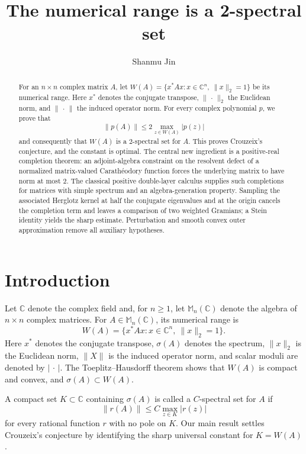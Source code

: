 \documentclass{aomart}
\title{The numerical range is a 2-spectral set}
\author{Shanmu Jin}
\theoremstyle{definition}
\newcommand{\C}{\mathbb C}
\newcommand{\Mn}{\mathbb M_n(\C)}
\begin{document}
\begin{abstract}
For an $n\times n$ complex matrix $A$, let
$W(A)=\{x^*Ax:x\in\C^n,\ \lVert x\rVert_2=1\}$ be its numerical range.
Here $x^*$ denotes the conjugate transpose, $\lVert\,\cdot\,\rVert_2$
the Euclidean norm, and $\lVert\,\cdot\,\rVert$ the induced operator
norm.  For every complex polynomial $p$, we prove that
\[
  \lVert p(A)\rVert\leq
  2\max_{z\in W(A)}\lvert p(z)\rvert
\]
and consequently that $W(A)$ is a $2$-spectral set for $A$.  This
proves Crouzeix's conjecture, and the constant is optimal.  The central
new ingredient is a positive-real
completion theorem: an adjoint-algebra constraint on the resolvent
defect of a normalized matrix-valued Carath\'eodory function forces the
underlying matrix to have norm at most $2$.  The classical positive
double-layer calculus supplies such completions for matrices with
simple spectrum and an algebra-generation property.  Sampling the
associated Herglotz kernel at half the conjugate eigenvalues and at the
origin cancels the completion term and leaves a comparison of two
weighted Gramians; a Stein identity yields the sharp estimate.
Perturbation and smooth convex outer approximation remove all auxiliary
hypotheses.
\end{abstract}

\maketitle

\section{Introduction}
\label{sec:introduction}

Let $\C$ denote the complex field and, for $n\geq1$, let $\Mn$ denote
the algebra of $n\times n$ complex matrices.  For $A\in\Mn$, its
numerical range is
\begin{equation}
  W(A)=\{x^*Ax:x\in\C^n,\ \lVert x\rVert_2=1\}.
  \label{eq:numerical-range}
\end{equation}
Here $x^*$ denotes the conjugate transpose, $\sigma(A)$ denotes the
spectrum, $\lVert x\rVert_2$ is the Euclidean norm, $\lVert X\rVert$ is
the induced operator norm, and scalar moduli are denoted by
$\lvert\,\cdot\,\rvert$.  The Toeplitz--Hausdorff theorem shows that
$W(A)$ is compact and convex, and $\sigma(A)\subset W(A)$.

A compact set $K\subset\C$ containing $\sigma(A)$ is called a
$C$-spectral set for $A$ if
\begin{equation}
  \lVert r(A)\rVert\leq C\max_{z\in K}\lvert r(z)\rvert
  \label{eq:spectral-set-definition}
\end{equation}
for every rational function $r$ with no pole on $K$.  Our main result
settles Crouzeix's conjecture by identifying the sharp universal
constant for $K=W(A)$.
\end{document}
